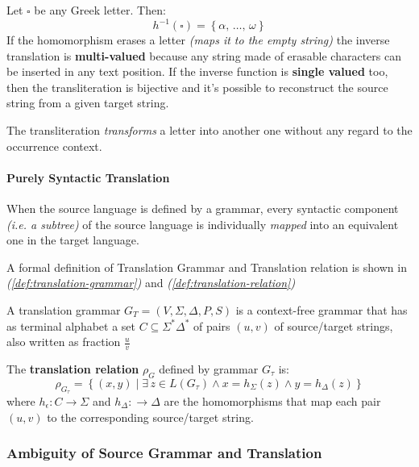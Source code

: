 \documentclass[english]{article}
\begin{document}
Let \(\square\) be any Greek letter.
Then:
\[ h^{-1}\left( \square \right) = \left\{ \alpha, \, \ldots, \, \omega \right\} \]
If the homomorphism erases a letter \textit{(maps it to the empty string)} the inverse translation is \textbf{multi-valued} because any string made of erasable characters can be inserted in any text position.
If the inverse function is \textbf{single valued} too, then the transliteration is bijective and it's possible to reconstruct the source string from a given target string.

\bigskip
The transliteration \textit{transforms} a letter into another one without any regard to the occurrence context.

\paragraph{Purely Syntactic Translation}

When the source language is defined by a grammar, every syntactic component \textit{(i.e. a subtree)} of the source language is individually \textit{mapped} into an equivalent one in the target language.

A formal definition of Translation Grammar and Translation relation is shown in \textit{(\ref{def:translation-grammar})} and \textit{(\ref{def:translation-relation})}

\begin{definition}
  \label{def:translation-grammar}
  A translation grammar \(G_T = \left( V, \Sigma, \Delta, P, S \right)\) is a context-free grammar that has as terminal alphabet a set \(C \subseteq \Sigma^\ast \Delta^\ast\) of pairs \(\left( u, v \right)\) of source/target strings, also written as fraction \(\frac{u}{v}\)
\end{definition}

\begin{definition}
  \label{def:translation-relation}
  The \textbf{translation relation} \(\rho_G\) defined by grammar \(G_\tau\) is:
  \[ \rho_{G_\tau}  = \left\{ \left( x, y \right) \mid \exists \, z \in L\left( G_\tau \right) \land x = h_\Sigma \left( z \right) \land y = h_\Delta \left( z \right) \right\} \]
  where \(h_\epsilon : C \rightarrow \Sigma\) and \(h_\Delta : \rightarrow \Delta\) are the homomorphisms that map each pair \(\left( u, v \right)\) to the corresponding source/target string.
\end{definition}

\subsubsection{Ambiguity of Source Grammar and Translation}
\end{document}
